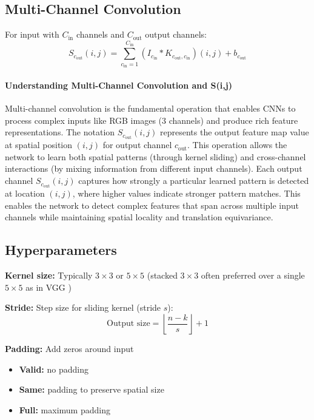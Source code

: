 \subsection{Multi-Channel Convolution}

For input with $C_{\text{in}}$ channels and $C_{\text{out}}$ output channels:
\begin{equation}
S_{c_{\text{out}}}(i,j) = \sum_{c_{\text{in}}=1}^{C_{\text{in}}} (I_{c_{\text{in}}} * K_{c_{\text{out}}, c_{\text{in}}})(i,j) + b_{c_{\text{out}}}
\end{equation}

\paragraph{Understanding Multi-Channel Convolution and S(i,j)}
Multi-channel convolution is the fundamental operation that enables CNNs to process complex inputs like RGB images (3 channels) and produce rich feature representations. The notation $S_{c_{\text{out}}}(i,j)$ represents the output feature map value at spatial position $(i,j)$ for output channel $c_{\text{out}}$. This operation allows the network to learn both spatial patterns (through kernel sliding) and cross-channel interactions (by mixing information from different input channels). Each output channel $S_{c_{\text{out}}}(i,j)$ captures how strongly a particular learned pattern is detected at location $(i,j)$, where higher values indicate stronger pattern matches. This enables the network to detect complex features that span across multiple input channels while maintaining spatial locality and translation equivariance.

\subsection{Hyperparameters}

\textbf{Kernel size:} Typically $3 \times 3$ or $5 \times 5$ (stacked $3\times3$ often preferred over a single $5\times5$ as in VGG \cite{GoodfellowEtAl2016})

\textbf{Stride:} Step size for sliding kernel (stride $s$):
\begin{equation}
\text{Output size} = \left\lfloor \frac{n - k}{s} \right\rfloor + 1
\end{equation}

\textbf{Padding:} Add zeros around input
\begin{itemize}
    \item \textbf{Valid:} no padding
    \item \textbf{Same:} padding to preserve spatial size
    \item \textbf{Full:} maximum padding
\end{itemize}

